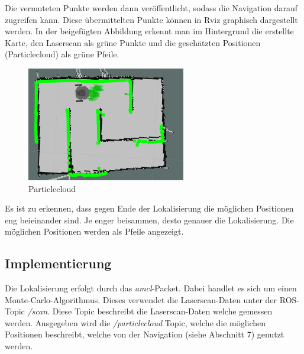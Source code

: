{{		Die vermuteten Punkte werden dann veröffentlicht, sodass die Navigation darauf zugreifen kann. Diese übermittelten Punkte können in Rviz graphisch dargestellt werden. In der beigefügten Abbildung erkennt man im Hintergrund die erstellte Karte, den Laserscan als grüne Punkte und die geschätzten Positionen (Particlecloud) als grüne Pfeile.
		
	\begin{figure}[H]
		\centering
		\includegraphics[height=5cm]{Bilder/amcl_clear_pointcloud.png}
		\caption{Particlecloud} 
		\label{pic:amclclearpos}
	\end{figure}

	Es ist zu erkennen, dass gegen Ende der Lokalisierung  die möglichen Positionen eng beieinander sind. Je enger beisammen, desto genauer die Lokalisierung. Die möglichen Positionen werden als Pfeile angezeigt.
	}

	\subsection{Implementierung}
	{
		Die Lokalisierung erfolgt durch das \textit{amcl}-Packet. Dabei handlet es sich um einen Monte-Carlo-Algorithmus. Dieses verwendet die Laserscan-Daten unter der ROS-Topic \emph{/scan}. Diese Topic beschreibt die Laserscan-Daten welche gemessen werden. Ausgegeben wird die \textit{/particlecloud} Topic, welche die möglichen Positionen beschreibt, welche von der Navigation (siehe Abschnitt 7) genutzt werden.
	}
}